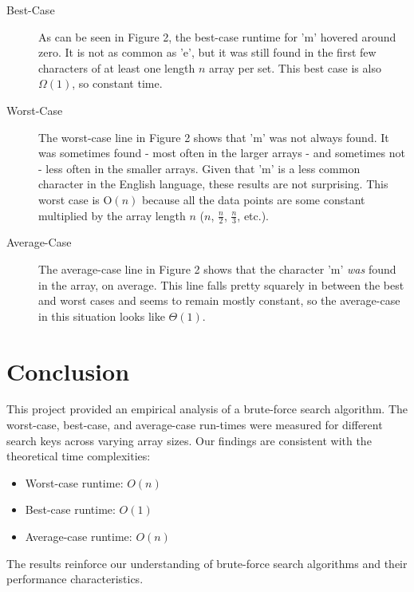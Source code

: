 \documentclass{article}
\begin{document}
 \begin{description}
    \item[Best-Case] As can be seen in Figure 2, the best-case runtime for 'm' hovered around zero. It is not as common as 'e', but it was still found in the first few characters of at least one length $n$ array per set. This best case is also $\Omega(1)$, so constant time.
    \item[Worst-Case] The worst-case line in Figure 2 shows that 'm' was not always found. It was sometimes found - most often in the larger arrays - and sometimes not - less often in the smaller arrays. Given that 'm' is a less common character in the English language, these results are not surprising. This worst case is O$(n)$ because all the data points are some constant multiplied by the array length $n$ ($n$, $\frac{n}{2}$, $\frac{n}{3}$, etc.).
    \item[Average-Case] The average-case line in Figure 2 shows that the character 'm' \textit{was} found in the array, on average. This line falls pretty squarely in between the best and worst cases and seems to remain mostly constant, so the average-case in this situation looks like $\Theta(1)$. 
\end{description}
	
\section{Conclusion}
This project provided an empirical analysis of a brute-force search algorithm. The worst-case, best-case, and average-case run-times were measured for different search keys across varying array sizes. Our findings are consistent with the theoretical time complexities:
	
    \begin{itemize}
        \item Worst-case runtime: \( O(n) \)
	\item Best-case runtime: \( O(1) \)
	\item Average-case runtime: \( O(n) \)
    \end{itemize}
The results reinforce our understanding of brute-force search algorithms and their performance characteristics.
\end{document}
